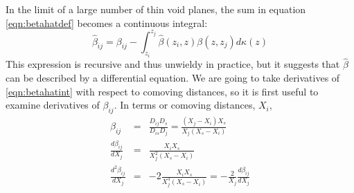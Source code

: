 \documentclass{emulateapj}
\newcommand\betahat{\hat{\beta}}
\begin{document}
In the limit of a large number of thin void planes, the sum in equation \ref{eqn:betahatdef} becomes a continuous integral:
\begin{equation}
\label{eqn:betahatint}
\betahat_{i j} = \beta_{ i j} - \int_{z_i}^{z_j} \betahat(z_i, z) \beta(z, z_j) d\kappa(z)
\end{equation}
This expression is recursive and thus unwieldy in practice, but it suggests that $\betahat$ can be described by a differential equation. We are going to take derivatives of \ref{eqn:betahatint} with respect to comoving distances, so it is first useful to examine derivatives of $\beta_{i j}$. In terms or comoving distances, $X_i$, 
\begin{eqnarray}
\beta_{i j} &=&\frac{D_{i j} D_s}{D_{i s} D_j} = \frac{(X_j - X_i) X_s}{X_j (X_s - X_i)} \\
\frac{d \beta_{i j}}{d X_j} &=& \frac{X_i X_s}{X_j^2 (X_s - X_i)}\\
\label{eqn:d2betahatdbetahat} 
\frac{d^2 \beta_{i j}}{d X_j} &=& -2 \frac{X_i X_s}{X_j^3 (X_s - X_i)} = -\frac{2}{X_j} \frac{d \beta_{i j}}{d X_j} 
\end{eqnarray}
\end{document}
